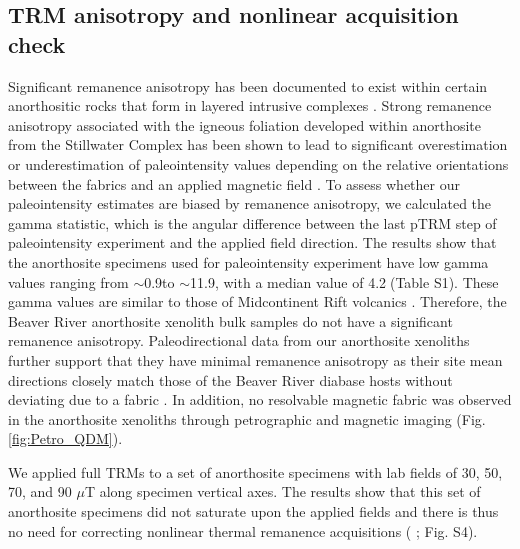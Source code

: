 \documentclass[9pt,twocolumn,twoside,lineno]{pnas-new}
\begin{document}
\subsection*{TRM anisotropy and nonlinear acquisition check}
Significant remanence anisotropy has been documented to exist within certain anorthositic rocks that form in layered intrusive complexes \cite{Selkin2000a, Feinberg2006a}. Strong remanence anisotropy associated with the igneous foliation developed within anorthosite from the Stillwater Complex has been shown to lead to significant overestimation or underestimation of paleointensity values depending on the relative orientations between the fabrics and an applied magnetic field \cite{Selkin2000a}. To assess whether our paleointensity estimates are biased by remanence anisotropy, we calculated the gamma statistic, which is the angular difference between the last pTRM step of paleointensity experiment and the applied field direction. The results show that the anorthosite specimens used for paleointensity experiment have low gamma values ranging from $\sim$0.9\textdegree to $\sim$11.9\textdegree, with a median value of 4.2\textdegree$\;$(Table S1). These gamma values are similar to those of Midcontinent Rift volcanics \cite{Sprain2018a}. Therefore, the Beaver River anorthosite xenolith bulk samples do not have a significant remanence anisotropy. Paleodirectional data from our anorthosite xenoliths further support that they have minimal remanence anisotropy as their site mean directions closely match those of the Beaver River diabase hosts without deviating due to a fabric \cite{Zhang2021b}. In addition, no resolvable magnetic fabric was observed in the anorthosite xenoliths through petrographic and magnetic imaging (Fig. \ref{fig:Petro_QDM}). 

We applied full TRMs to a set of anorthosite specimens with lab fields of 30, 50, 70, and 90 $\mu$T along specimen vertical axes. The results show that this set of anorthosite specimens did not saturate upon the applied fields and there is thus no need for correcting nonlinear thermal remanence acquisitions ( \citealp{Selkin2007a}; Fig. S4). 
\end{document}
